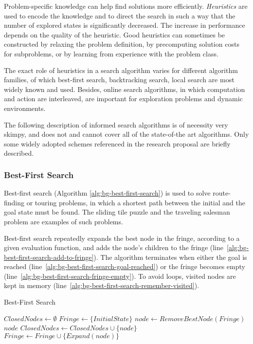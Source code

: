 Problem-specific knowledge can help find solutions more
efficiently. {\em Heuristics} are used to encode the knowledge and to
direct the search in such a way that the number of explored states is
significantly decreased. The increase in performance depends on the
quality of the heuristic. Good heuristics can sometimes be constructed
by relaxing the problem definition, by precomputing solution costs for
subproblems, or by learning from experience with the problem class.

The exact role of heuristics in a search algorithm varies for
different algorithm families, of which best-first search, backtracking
search, local search are most widely known and used. Besides, online
search algorithms, in which computation and action are interleaved,
are important for exploration problems and dynamic environments.

The following description of informed search algorithms is of
necessity very skimpy, and does not and cannot cover all of the
state-of-the art algorithms. Only some widely adopted schemes
referenced in the research proposal are briefly described.
                             
\subsubsection{Best-First Search}

Best-first search (Algorithm \ref{alg:bg-best-first-search}) is used to
solve route-finding or touring problems, in which a shortest path
between the initial and the goal state must be found. The sliding tile
puzzle and the traveling salesman problem are examples of such
problems.

Best-first search repeatedly expands the best node in the fringe,
according to a given evaluation function, and adds the node's children
to the fringe (line~\ref{alg:bg-best-first-search-add-to-fringe}). The
algorithm terminates when either the goal is reached
(line~\ref{alg:bg-best-first-search-goal-reached}) or the fringe becomes
empty (line~\ref{alg:bg-best-first-search-fringe-empty}). To avoid
loops, visited nodes are kept in memory (line~\ref{alg:bg-best-first-search-remember-visited}).

\begin{algorithm}
\caption{Best-First Search}
\label{alg:bg-best-first-search}
\begin{algorithmic}[1]
\State $ClosedNodes \leftarrow \emptyset$
\State $Fringe \leftarrow \{InitialState\}$
\Loop
    \label{alg:bg-best-first-search-fringe-empty}
  \EndIf
  \State $node \leftarrow RemoveBestNode(Fringe)$
    \label{alg:bg-best-first-search-goal-reached}
    \Return $node$
  \EndIf
    \State $ClosedNodes \leftarrow ClosedNodes \cup \{node\}$ \label{alg:bg-best-first-search-remember-visited}
    \State $Fringe \leftarrow Fringe \cup \{Expand(node) \}$ \label{alg:bg-best-first-search-add-to-fringe}
  \EndIf
\EndLoop
\end{algorithmic}
\end{algorithm}

